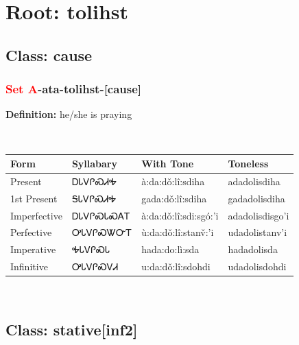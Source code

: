 \needspace{4in}
\section*{Root: tolihst}
\nopagebreak
{}
\needspace{3in}
\subsection*{Class: cause}
\nopagebreak
\needspace{2in}
\subsubsection*{\textcolor{Red}{Set A}{-}ata{-}\textbf{tolihst}{-}[cause]}
\nopagebreak
\textbf{Definition: } he/she is praying
\\[0.5em]
\begin{tabularx}{\textwidth}{l X X X}%
\toprule%
\textbf{Form}&\textbf{Syllabary}&\textbf{With Tone}&\textbf{Toneless}\\%
\midrule%
Present&ᎠᏓᏙᎵᏍᏗᎭ&à:da:dǒ:lî:sdiha&adadolisdiha\\%
1st Present&ᎦᏓᏙᎵᏍᏗᎭ&gada:dǒ:lî:sdiha&gadadolisdiha\\%
Imperfective&ᎠᏓᏙᎵᏍᏓᏍᎪᎢ&à:da:dǒ:lî:sdi:sgó:’i&adadolisdisgo’i\\%
Perfective&ᎤᏓᏙᎵᏍᏔᏅᎢ&ù:da:dǒ:lî:stanv̌:’i&udadolistanv’i\\%
Imperative&ᎭᏓᏙᎵᏍᏓ&hada:do:lì:sda&hadadolisda\\%
Infinitive&ᎤᏓᏙᎵᏍᏙᏗ&u:da:dǒ:lî:sdohdi&udadolisdohdi\\%
\bottomrule%
\end{tabularx}
\\[1em]
\needspace{3in}
\subsection*{Class: stative[inf2]}
\nopagebreak
\needspace{2in}
